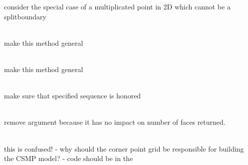 \begin{DoxyRefList}
consider the special case of a multiplicated point in 2D which cannot be a splitboundary  
\item[Member \doxylink{namespacecsmp_adef1aba7445f0683653d2d181752c75b}{csmp\+::contains\+Point} (\doxylink{classcsmp_1_1_element}{Element$<$ dim $>$} \texorpdfstring{$\ast$}{*}, const \doxylink{classcsmp_1_1_point}{Point$<$ dim $>$} \&, size\+\_\+t region\+\_\+idx)]\hfill \\
\label{todo__todo000192}%
%
make this method general  
\item[Member \doxylink{namespacecsmp_a6c91e0905147f4eaa1738bb7a41f61a6}{csmp\+::contains\+Point\+Linear\+Triangle} (\doxylink{classcsmp_1_1_element}{Element$<$ dim $>$} \texorpdfstring{$\ast$}{*}elmt, const \doxylink{classcsmp_1_1_point}{Point$<$ dim $>$} \&point, size\+\_\+t region\+\_\+idx)]\hfill \\
\label{todo__todo000193}%
%
make this method general  
\item[Member \doxylink{classcsmp_1_1_coordinate_transformer_a382ca50cd25b154b2269661951447065}{csmp\+::Coordinate\+Transformer\texorpdfstring{$<$}{<} dim \texorpdfstring{$>$}{>}\+::Transform} (\doxylink{classcsmp_1_1_point}{Point$<$ dim $>$} \&) const]\hfill \\
\label{todo__todo000050}%
%
make sure that specified sequence is honored  
\item[Member \doxylink{classcsmp_1_1_corner_point_cell_af0c954ea7217eade34eeb490b6e8dd84}{csmp\+::Corner\+Point\+Cell\+::Get\+Num\+Faces} (size\+\_\+t fid) const]\hfill \\
\label{todo__todo000196}%
%
remove argument because it has no impact on number of faces returned.  
\item[Member \doxylink{classcsmp_1_1_corner_point_grid_a38c23e1bcbf434ac85f39cf70f7353da}{csmp\+::Corner\+Point\+Grid\+::Create\+Model} (const std\+::string \&model\+\_\+name, \doxylink{classcsmp_1_1_v_set}{csmp\+::\+VSet$<$ 3\+U $>$} \&vset, \doxylink{classcsmp_1_1_model_topology}{csmp\+::\+Model\+Topology} \&model\+\_\+topology, const std\+::vector$<$ double $>$ \&zcorn, std\+::set$<$ std\+::string $>$ \&regions, std\+::set$<$ std\+::string $>$ \&faults, std\+::set$<$ std\+::string $>$ \&wells, bool tetra\+\_\+mesh, bool exclude\+\_\+inactive\+\_\+cells)]\hfill \\
\label{todo__todo000197}%
%
this is confused! -\/ why should the corner point grid be responsible for building the CSMP model? -\/ code should be in the 


\end{DoxyRefList}
